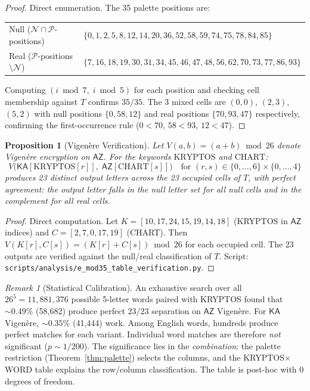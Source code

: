 \documentclass[11pt]{article}
\theoremstyle{plain}
\newtheorem{proposition}[theorem]{Proposition}
\theoremstyle{definition}
\theoremstyle{remark}
\newtheorem{remark}[theorem]{Remark}
\newcommand{\KA}{\mathsf{KA}}
\newcommand{\AZ}{\mathsf{AZ}}
\newcommand{\palette}{\mathcal{P}}
\begin{document}
\begin{proof}
Direct enumeration. The 35 palette positions are:
\begin{center}
\begin{tabular}{ll}
\toprule
Null ($\mathcal{N} \cap \palette$-positions) & $\{0, 1, 2, 5, 8, 12, 14, 20, 36, 52, 58, 59, 74, 75, 78, 84, 85\}$ \\
Real ($\palette$-positions $\setminus \mathcal{N}$) & $\{7, 16, 18, 19, 30, 31, 34, 45, 46, 47, 48, 56, 62, 70, 73, 77, 86, 93\}$ \\
\bottomrule
\end{tabular}
\end{center}

Computing $(i \bmod 7, \; i \bmod 5)$ for each position and checking cell membership against $T$ confirms $35/35$. The 3 mixed cells are $(0,0)$, $(2,3)$, $(5,2)$ with null positions $\{0, 58, 12\}$ and real positions $\{70, 93, 47\}$ respectively, confirming the first-occurrence rule ($0 < 70$, $58 < 93$, $12 < 47$).
\end{proof}

\begin{proposition}[Vigen\`{e}re Verification]
\label{prop:vig-chart}
Let $V(a,b) = (a + b) \bmod 26$ denote Vigen\`{e}re encryption on $\AZ$. For the keywords $\text{KRYPTOS}$ and $\text{CHART}$:
\begin{equation}
V\bigl(\KA[\text{KRYPTOS}[r]], \; \AZ[\text{CHART}[s]]\bigr) \quad \text{for } (r,s) \in \{0,\ldots,6\}\times\{0,\ldots,4\}
\end{equation}
produces 23 distinct output letters across the 23 occupied cells of $T$, with perfect agreement: the output letter falls in the null letter set for all null cells and in the complement for all real cells.
\end{proposition}

\begin{proof}
Direct computation. Let $K = [10, 17, 24, 15, 19, 14, 18]$ (KRYPTOS in $\AZ$ indices) and $C = [2, 7, 0, 17, 19]$ (CHART). Then $V(K[r], C[s]) = (K[r] + C[s]) \bmod 26$ for each occupied cell. The 23 outputs are verified against the null/real classification of $T$. Script: \texttt{scripts/analysis/e\_mod35\_table\_verification.py}.
\end{proof}

\begin{remark}[Statistical Calibration]
\label{rem:mod35-stats}
An exhaustive search over all $26^5 = 11{,}881{,}376$ possible 5-letter words paired with KRYPTOS found that $\sim 0.49\%$ (58,682) produce perfect $23/23$ separation on $\AZ$ Vigen\`{e}re. For $\KA$ Vigen\`{e}re, $\sim 0.35\%$ (41,444) work. Among English words, hundreds produce perfect matches for each variant. Individual word matches are therefore \emph{not} significant ($p \sim 1/200$). The significance lies in the \emph{combination}: the palette restriction (Theorem~\ref{thm:palette}) selects the columns, and the KRYPTOS$\times$WORD table explains the row/column classification. The table is post-hoc with 0 degrees of freedom.
\end{remark}
\end{document}
